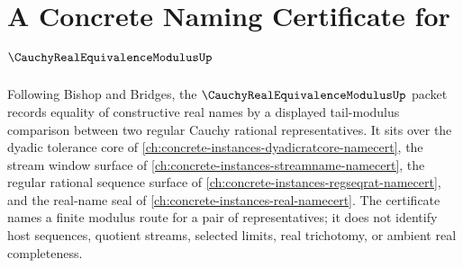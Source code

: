\chapter{A Concrete Naming Certificate for $\CauchyRealEquivalenceModulusUp$}
\label{ch:concrete-instances-cauchy-real-equivalence-modulus-namecert}

Following Bishop and Bridges, the $\CauchyRealEquivalenceModulusUp$ packet records equality of constructive real names by a displayed tail-modulus comparison between two regular Cauchy rational representatives. It sits over the dyadic tolerance core of \autoref{ch:concrete-instances-dyadicratcore-namecert}, the stream window surface of \autoref{ch:concrete-instances-streamname-namecert}, the regular rational sequence surface of \autoref{ch:concrete-instances-regseqrat-namecert}, and the real-name seal of \autoref{ch:concrete-instances-real-namecert}. The certificate names a finite modulus route for a pair of representatives; it does not identify host sequences, quotient streams, selected limits, real trichotomy, or ambient real completeness.

